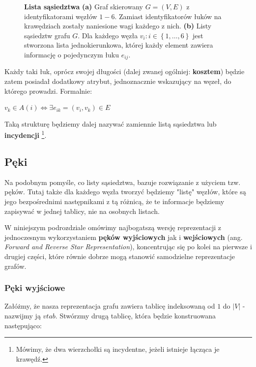 \begin{figure}[!htbp]
\begin{subfigure}[b]{0.33\textwidth}
		\caption{}
	\end{subfigure}
	\caption{\textbf{Lista sąsiedztwa} \textbf{(a)} Graf skierowany $G = \left( V, E \right)$ z identyfikatorami węzłów $1-6$. Zamiast identyfikatorów łuków na krawędziach zostały naniesione wagi każdego z nich. \textbf{(b)} Listy sąsiedztw grafu $G$. Dla każdego węzła $v_{i} : i \in \left\{ 1, \ldots, 6 \right\}$ jest stworzona lista jednokierunkowa, której każdy element zawiera informację o pojedynczym łuku $e_{ij}$.}\label{fig:adjacencyList}
\end{figure}

Każdy taki łuk, oprócz swojej długości (dalej zwanej ogólniej: \textbf{kosztem}) będzie zatem posiadał dodatkowy atrybut, jednoznacznie wskazujący na węzeł, do którego prowadzi. Formalnie:

$v_{k} \in A \left ( i \right ) \Leftrightarrow \exists e_{ik} = \left( v_{i}, v_{k} \right) \in E $

Taką strukturę będziemy dalej nazywać zamiennie listą sąsiedztwa lub \textbf{incydencji} \footnote{Mówimy, że dwa wierzchołki są incydentne, jeżeli istnieje łącząca je krawędź.}.

\subsection{Pęki}

Na podobnym pomyśle, co listy sąsiedztwa, bazuje rozwiązanie z użyciem tzw. pęków. Tutaj także dla każdego węzła tworzyć będziemy "listę" węzłów, które są jego bezpośrednimi następnikami z tą różnicą, że te informacje będziemy zapisywać w jednej tablicy, nie na osobnych listach.

W niniejszym podrozdziale omówimy najbogatszą wersję reprezentacji z jednoczesnym wykorzystaniem \textbf{pęków wyjściowych} jak i \textbf{ wejściowych} (ang. \textit{Forward and Reverse Star Representation}), koncentrując się po kolei na pierwsze i drugiej części, które równie dobrze mogą stanowić samodzielne reprezentacje grafów.

\subsubsection{Pęki wyjściowe}

Załóżmy, że nasza reprezentacja grafu zawiera tablicę indeksowaną od $1$ do $ \left| V \right| $ - nazwijmy ją $vtab$. Stwórzmy drugą tablicę, która będzie konstruowana następująco:

